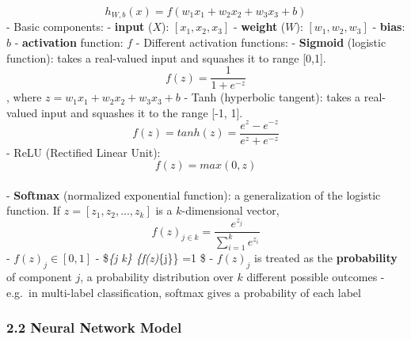 \documentclass[11pt]{article}
\begin{document}
 \[h_{W,b}(x)=f(w_1x_1+w_2x_2+w_3x_3+b)\] - Basic components: -
\textbf{input} (\(X\)): \([x_1, x_2, x_3]\) - \textbf{weight} (\(W\)):
\([w_1, w_2, w_3]\) - \textbf{bias}: \(b\) - \textbf{activation}
function: \(f\) - Different activation functions: - \textbf{Sigmoid}
(logistic function): takes a real-valued input and squashes it to range
{[}0,1{]}. \[f(z)=\frac{1}{1+e^{-z}}\], where
\(z=w_1x_1+w_2x_2+w_3x_3+b\) - Tanh (hyperbolic tangent): takes a
real-valued input and squashes it to the range {[}-1, 1{]}.
\[f(z)=tanh(z)=\frac{e^z-e^{-z}}{e^z+e^{-z}}\] - ReLU (Rectified Linear
Unit): \[f(z)=max(0,z)\]\\
- \textbf{Softmax} (normalized exponential function): a generalization
of the logistic function. If \(z=[z_1, z_2, ..., z_k]\) is a
\(k\)-dimensional vector,
\[f(z)_{j \in k}=\frac{e^{z_j}}{\sum_{i=1}^k{e^{z_i}}}\] -
\(f(z)_{j} \in [0,1]\) - \$\sum\emph{\{j \in k\} \{f(z)}\{j\}\} =1 \$ -
\(f(z)_{j}\) is treated as the \textbf{probability} of component \(j\),
a probability distribution over \(k\) different possible outcomes -
e.g.~in multi-label classification, softmax gives a probability of each
label

    \hypertarget{neural-network-model}{%
\subsubsection{2.2 Neural Network Model}\label{neural-network-model}}
\end{document}
